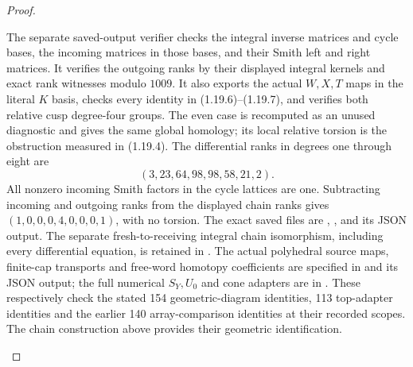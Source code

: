\begin{proof}
\begin{enumerate}[label=\arabic*.]
The separate saved-output verifier checks the integral inverse
matrices and cycle bases, the incoming matrices in those bases, and
their Smith left and right matrices.  It verifies the outgoing ranks
by their displayed integral kernels and exact rank witnesses modulo
$1009$.  It also exports the actual $W,X,T$ maps in the literal $K$
basis, checks every identity in (1.19.6)--(1.19.7), and verifies both
relative cusp degree-four groups.  The even case is recomputed as
an unused diagnostic and gives the same global homology; its local
relative torsion is the obstruction measured in (1.19.4).
The differential ranks in degrees one through eight are
\[
                 (3,23,64,98,98,58,21,2).
\]
All nonzero incoming Smith factors in the cycle lattices are one.
Subtracting incoming and outgoing ranks from the displayed chain
ranks gives $(1,0,0,0,4,0,0,0,1)$, with no torsion.
The exact saved files are
,
,
and its JSON output. The separate fresh-to-receiving integral
chain isomorphism, including every differential equation, is retained
in .
The actual polyhedral source maps, finite-cap transports and
free-word homotopy coefficients are specified in
and its JSON output; the full numerical $S_Y,U_0$ and cone adapters
are in .
These respectively check the stated 154 geometric-diagram identities,
113 top-adapter identities and the earlier 140 array-comparison
identities at their recorded scopes. The chain construction above
provides their geometric identification.

\end{enumerate}
\end{proof}
